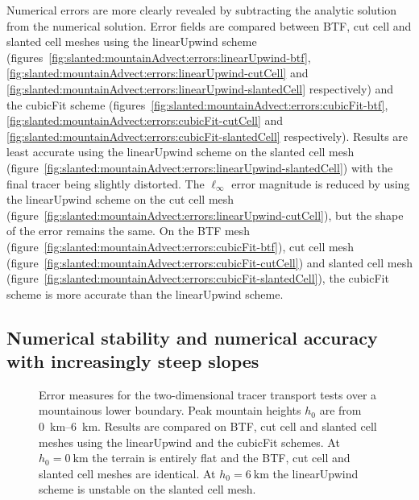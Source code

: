 Numerical errors are more clearly revealed by subtracting the analytic solution from the numerical solution.
Error fields are compared between BTF, cut cell and slanted cell meshes using the linearUpwind scheme (figures~\ref{fig:slanted:mountainAdvect:errors:linearUpwind-btf},
\ref{fig:slanted:mountainAdvect:errors:linearUpwind-cutCell} and
\ref{fig:slanted:mountainAdvect:errors:linearUpwind-slantedCell} respectively) and the cubicFit scheme (figures~\ref{fig:slanted:mountainAdvect:errors:cubicFit-btf},
\ref{fig:slanted:mountainAdvect:errors:cubicFit-cutCell} and
\ref{fig:slanted:mountainAdvect:errors:cubicFit-slantedCell} respectively).
Results are least accurate using the linearUpwind scheme on the slanted cell mesh (figure~\ref{fig:slanted:mountainAdvect:errors:linearUpwind-slantedCell}) with the final tracer being slightly distorted.
The $\ell_\infty$ error magnitude is reduced by using the linearUpwind scheme on the cut cell mesh (figure~\ref{fig:slanted:mountainAdvect:errors:linearUpwind-cutCell}), but the shape of the error remains the same.
On the BTF mesh (figure~\ref{fig:slanted:mountainAdvect:errors:cubicFit-btf}), cut cell mesh (figure~\ref{fig:slanted:mountainAdvect:errors:cubicFit-cutCell}) and slanted cell mesh (figure~\ref{fig:slanted:mountainAdvect:errors:cubicFit-slantedCell}), the cubicFit scheme is more accurate than the linearUpwind scheme.

\subsection{Numerical stability and numerical accuracy with increasingly steep slopes}

\begin{figure}
	\centering
	
%
	\caption{Error measures for the two-dimensional tracer transport tests over a mountainous lower boundary.  Peak mountain heights $h_0$ are from \SIrange{0}{6}{\kilo\meter}.  Results are compared on BTF, cut cell and slanted cell meshes using the linearUpwind and the cubicFit schemes.  At $h_0 = \SI{0}{\kilo\meter}$ the terrain is entirely flat and the BTF, cut cell and slanted cell meshes are identical.  At $h_0 = \SI{6}{\kilo\meter}$ the linearUpwind scheme is unstable on the slanted cell mesh.}
	\label{fig:slanted:mountainAdvect:l2ByMountainHeight}
\end{figure}

